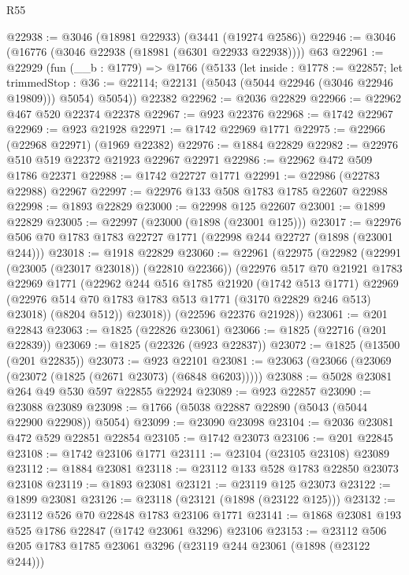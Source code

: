 \begin{lexlean}{R55}
\begin{coremodule}
@22938 := @3046 (@18981 @22933) (@3441 (@19274 @2586))
@22946 := @3046 (@16776 (@3046 @22938 (@18981 (@6301 @22933 @22938)))) @63
@22961 := @22929
    (fun (__b : @1779) =>
    @1766
      (@5133
        (let inside : @1778 := @22857;
        let trimmedStop : @36 := @22114; @22131 (@5043 (@5044 @22946 (@3046 @22946 @19809))) @5054)
        @5054))
    @22382
@22962 := @2036 @22829
@22966 := @22962 @467 @520 @22374 @22378
@22967 := @923 @22376
@22968 := @1742 @22967
@22969 := @923 @21928
@22971 := @1742 @22969 @1771
@22975 := @22966 (@22968 @22971) (@1969 @22382)
@22976 := @1884 @22829
@22982 := @22976 @510 @519 @22372 @21923 @22967 @22971
@22986 := @22962 @472 @509 @1786 @22371
@22988 := @1742 @22727 @1771
@22991 := @22986 (@22783 @22988) @22967
@22997 := @22976 @133 @508 @1783 @1785 @22607 @22988
@22998 := @1893 @22829
@23000 := @22998 @125 @22607
@23001 := @1899 @22829
@23005 := @22997 (@23000 (@1898 (@23001 @125)))
@23017 := @22976 @506 @70 @1783 @1783 @22727 @1771 (@22998 @244 @22727 (@1898 (@23001 @244)))
@23018 := @1918 @22829
@23060 := @22961
    (@22975
      (@22982
        (@22991 (@23005 (@23017 @23018)) (@22810 @22366))
        (@22976
          @517
          @70
          @21921
          @1783
          @22969
          @1771
          (@22962
            @244
            @516
            @1785
            @21920
            (@1742 @513 @1771)
            @22969
            (@22976 @514 @70 @1783 @1783 @513 @1771 (@3170 @22829 @246 @513) @23018)
            (@8204 @512))
          @23018))
      (@22596 @22376 @21928))
@23061 := @201 @22843
@23063 := @1825 (@22826 @23061)
@23066 := @1825 (@22716 (@201 @22839))
@23069 := @1825 (@22326 (@923 @22837))
@23072 := @1825 (@13500 (@201 @22835))
@23073 := @923 @22101
@23081 := @23063 (@23066 (@23069 (@23072 (@1825 (@2671 @23073) (@6848 @6203)))))
@23088 := @5028 @23081 @264 @49 @530 @597 @22855 @22924
@23089 := @923 @22857
@23090 := @23088 @23089
@23098 := @1766 (@5038 @22887 @22890 (@5043 (@5044 @22900 @22908)) @5054)
@23099 := @23090 @23098
@23104 := @2036 @23081 @472 @529 @22851 @22854
@23105 := @1742 @23073
@23106 := @201 @22845
@23108 := @1742 @23106 @1771
@23111 := @23104 (@23105 @23108) @23089
@23112 := @1884 @23081
@23118 := @23112 @133 @528 @1783 @22850 @23073 @23108
@23119 := @1893 @23081
@23121 := @23119 @125 @23073
@23122 := @1899 @23081
@23126 := @23118 (@23121 (@1898 (@23122 @125)))
@23132 := @23112 @526 @70 @22848 @1783 @23106 @1771
@23141 := @1868 @23081 @193 @525 @1786 @22847 (@1742 @23061 @3296) @23106
@23153 := @23112 @506 @205 @1783 @1785 @23061 @3296 (@23119 @244 @23061 (@1898 (@23122 @244)))

\end{coremodule}
\end{lexlean}
